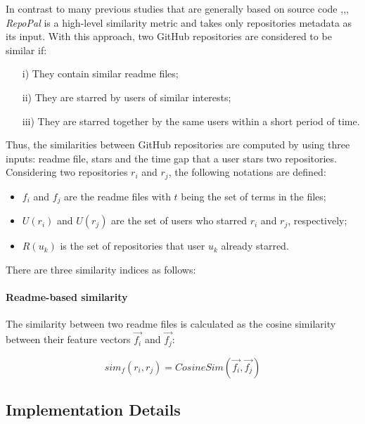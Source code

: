 In contrast to many previous studies that are generally based on source code \cite{10.1109/APSEC.2004.69},\cite{Liu:2006:GDS:1150402.1150522},\cite{McMillan:2012:DSS:2337223.2337267}, \textit{RepoPal}  \cite{10.1109/SANER.2017.7884605} is a high-level similarity metric and takes only repositories metadata as its input. With this approach, two GitHub repositories are considered to be similar if:

\begin{itemize}
	\item[i)] They contain similar readme files;
	\item[ii)] They are starred by users of similar interests;
	\item[iii)] They are starred together by the same users within a short period of time. 
\end{itemize}

Thus, the similarities between GitHub repositories are computed by using three inputs: readme file, stars and the time gap that a user stars two repositories. Considering two repositories $ r_{i} $ and $ r_{j} $, the following notations are defined: 

\begin{itemize}
	\item $ f_{i} $ and $ f_{j} $ are the readme files with $ t $ being the set of terms in the files; 
	\item $ U(r_{i}) $ and $ U(r_{j}) $ are the set of users who starred $ r_{i} $ and $ r_{j} $, respectively; 
	\item $ R(u_{k}) $ is the set of repositories that user $ u_{k} $ already starred.  
\end{itemize}

There are three similarity indices as follows:

\paragraph{Readme-based similarity} 

The similarity between two readme files is calculated as the cosine similarity between their feature vectors $\vec{f_{i}}$ and $\vec{f_{j}}$: 

\begin{equation}
sim_{f}(r_{i},r_{j})=CosineSim(\vec{f_{i}},\vec{f_{j}})
\end{equation}


\subsection{Implementation Details}

